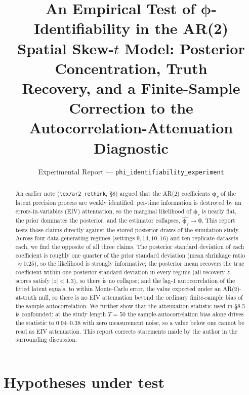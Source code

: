 \documentclass[11pt]{article}
\title{
  An Empirical Test of $\bm{\phi}$-Identifiability in the AR(2)\\
  Spatial Skew-$t$ Model: Posterior Concentration, Truth\\
  Recovery, and a Finite-Sample Correction to the\\
  Autocorrelation-Attenuation Diagnostic
}
\author{Experimental Report --- \texttt{phi\_identifiability\_experiment}}
\date{}
\theoremstyle{definition}
\newcommand{\phitau}{\bm{\phi}_\tau}
\newcommand{\code}[1]{\texttt{#1}}
\begin{document}
\maketitle

\begin{abstract}
An earlier note (\code{tex/ar2\_rethink}, \S8) argued that the AR(2)
coefficients $\phitau$ of the latent precision process are weakly identified:
per-time information is destroyed by an errors-in-variables (EIV) attenuation, so
the marginal likelihood of $\phitau$ is nearly flat, the prior dominates the
posterior, and the estimator collapses, $\hat{\phitau}\to\bm{0}$. This report
tests those claims directly against the stored posterior draws of the simulation
study. Across four data-generating regimes (settings $9,14,10,16$) and ten
replicate datasets each, we find the opposite of all three claims. The posterior
standard deviation of each coefficient is roughly one quarter of the prior
standard deviation (mean shrinkage ratio $\approx 0.25$), so the likelihood is
strongly informative; the posterior mean recovers the true coefficient within one
posterior standard deviation in every regime (all recovery $z$-scores satisfy
$|z|<1.3$), so there is no collapse; and the lag-1 autocorrelation of the fitted
latent equals, to within Monte-Carlo error, the value expected under an
AR(2)-at-truth null, so there is no EIV attenuation beyond the ordinary
finite-sample bias of the sample autocorrelation. We further show that the
attenuation statistic used in \S8.5 is confounded: at the study length $T=50$ the
sample-autocorrelation bias alone drives the statistic to $0.94$--$0.38$ with zero
measurement noise, so a value below one cannot be read as EIV attenuation. This
report corrects statements made by the author in the surrounding discussion.
\end{abstract}

\section{Hypotheses under test}
\label{sec:hyp}
\end{document}
